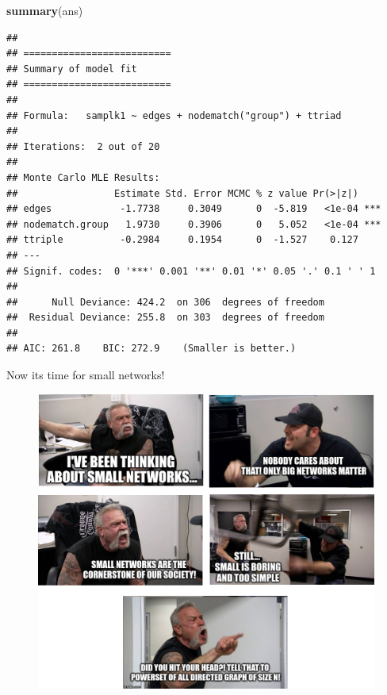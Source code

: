 \documentclass[10pt,ignorenonframetext,aspectratio=169,]{beamer}
\newenvironment{Shaded}{\begin{snugshade}}{\end{snugshade}}
\newcommand{\KeywordTok}[1]{\textcolor[rgb]{0.13,0.29,0.53}{\textbf{#1}}}
\newcommand{\NormalTok}[1]{#1}
\begin{document}
\begin{frame}[fragile]

\footnotesize

\begin{Shaded}
\begin{Highlighting}[]
\KeywordTok{summary}\NormalTok{(ans)}
\end{Highlighting}
\end{Shaded}

\begin{verbatim}
## 
## ==========================
## Summary of model fit
## ==========================
## 
## Formula:   samplk1 ~ edges + nodematch("group") + ttriad
## 
## Iterations:  2 out of 20 
## 
## Monte Carlo MLE Results:
##                 Estimate Std. Error MCMC % z value Pr(>|z|)    
## edges            -1.7738     0.3049      0  -5.819   <1e-04 ***
## nodematch.group   1.9730     0.3906      0   5.052   <1e-04 ***
## ttriple          -0.2984     0.1954      0  -1.527    0.127    
## ---
## Signif. codes:  0 '***' 0.001 '**' 0.01 '*' 0.05 '.' 0.1 ' ' 1
## 
##      Null Deviance: 424.2  on 306  degrees of freedom
##  Residual Deviance: 255.8  on 303  degrees of freedom
##  
## AIC: 261.8    BIC: 272.9    (Smaller is better.)
\end{verbatim}

\normalsize

\end{frame}

\begin{frame}

Now its time for \LARGE small \Huge networks!\normalsize 

\end{frame}

\begin{frame}

\begin{figure}
\includegraphics[height = \textheight]{fig/american-chopper-argument-ergmitos.png}
\end{figure}

\end{frame}
\end{document}
